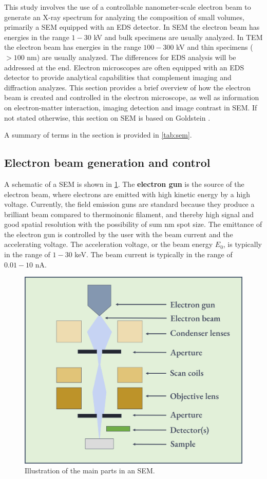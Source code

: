 This study involves the use of a controllable nanometer-scale electron beam to generate an X-ray spectrum for analyzing the composition of small volumes, primarily a SEM equipped with an EDS detector.
In SEM the electron beam has energies in the range $1-30$ kV and bulk specimens are usually analyzed.
In TEM the electron beam has energies in the range $100-300$ kV and thin specimens ($> 100$ nm) are usually analyzed.
The differences for EDS analysis will be addressed at the end.
Electron microscopes are often equipped with an EDS detector to provide analytical capabilities that complement imaging and diffraction analyzes.
This section provides a brief overview of how the electron beam is created and controlled in the electron microscope, as well as information on electron-matter interaction, imaging detection and image contrast in SEM.
If not stated otherwise, this section on SEM is based on Goldstein \cite{goldstein_scanning_2018}.

A summary of terms in the section is provided in \cref{tab:sem}.


\subsection{Electron beam generation and control}
\label{theory:sem:setup}

A schematic of a SEM is shown in \cref{fig:SEM_setup}. The \textbf{electron gun} is the source of the electron beam, where electrons are emitted with high kinetic energy by a high voltage.
Currently, the field emission guns are standard because they produce a brilliant beam compared to thermoinonic filament, and thereby high signal and good spatial resolution with the possibility of sum nm spot size.
The emittance of the electron gun is controlled by the user with the beam current and the accelerating voltage.
The acceleration voltage, or the beam energy $E_0$, is typically in the range of $1-30$ keV.
The beam current is typically in the range of $0.01-10$ nA.


\begin{figure}[ht]
    \centering
    \includegraphics[width=0.8\linewidth]{figures/SEM_setup.png}
    \caption{
        Illustration of the main parts in an SEM.
    }
    \label{fig:SEM_setup}
\end{figure}


